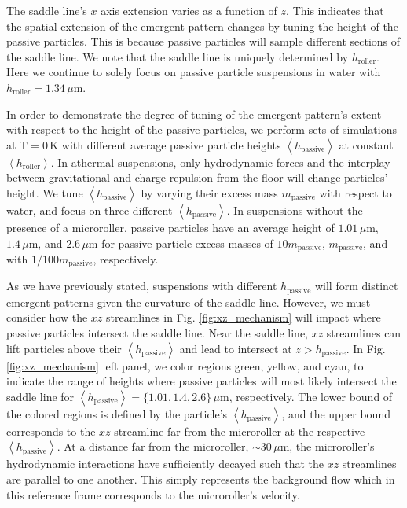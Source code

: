 \documentclass[12pt]{article}
\begin{document}
The saddle line's $x$ axis extension varies as a function of $z$. This indicates that the spatial extension of the emergent pattern changes by tuning the height of the passive particles. This is because passive particles will sample different sections of the saddle line. We note that the saddle line is uniquely determined by $h_\mathrm{roller}$. Here we continue to solely focus on passive particle suspensions in water with $h_\mathrm{roller} =  1.34 \, \mu \mathrm{m}$. 

In order to demonstrate the degree of tuning of the emergent pattern's extent with respect to the height of the passive particles, we perform sets of simulations at $\mathrm{T} = 0 \, \mathrm{K}$ with different average passive particle heights $\left < h_\mathrm{passive} \right > $ at constant $\left < h_\mathrm{roller} \right > $. In athermal suspensions, only hydrodynamic forces and the interplay between gravitational and charge repulsion from the floor will change particles' height. We tune $\left < h_\mathrm{passive} \right > $ by varying their excess mass $m_\mathrm{passive}$ with respect to water, and focus on three different $\left < h_\mathrm{passive} \right > $. In suspensions without the presence of a microroller, passive particles have an average height of $1.01 \, \mu \mathrm{m}$,  $1.4 \, \mu \mathrm{m}$, and $2.6 \, \mu \mathrm{m}$ for passive particle excess masses of $10 m_\mathrm{passive}$, $m_\mathrm{passive}$, and with $1/100 m_\mathrm{passive}$, respectively.  

As we have previously stated, suspensions with different $h_\mathrm{passive}$ will form distinct emergent patterns given the curvature of the saddle line. However, we must consider how the $xz$ streamlines in Fig. \ref{fig:xz_mechanism} will impact where passive particles intersect the saddle line. Near the saddle line, $xz$ streamlines can lift particles above their $\left < h_\mathrm{passive} \right >$ and lead to intersect at $z > h_\mathrm{passive}$. In Fig. \ref{fig:xz_mechanism} left panel, we color regions  green, yellow, and cyan, to indicate the range of heights where passive particles will most likely intersect the saddle line for $\left < h_\mathrm{passive} \right > =  \{1.01, 1.4,2.6\} \, \mu \mathrm{m}$, respectively. The lower bound of the colored regions is defined by the particle's $\left < h_\mathrm{passive} \right >$, and the upper bound corresponds to the $xz$ streamline far from the microroller at the respective $\left < h_\mathrm{passive} \right >$. At a distance far from the microroller, $\sim 30 \, \mu \mathrm{m} $, the microroller's hydrodynamic interactions have sufficiently decayed such that the $xz$ streamlines are parallel to one another. This simply represents the background flow which in this reference frame corresponds to the microroller's velocity. 
\end{document}
